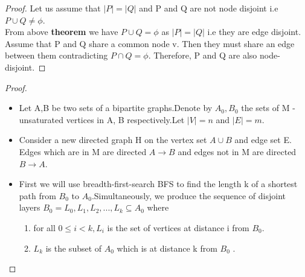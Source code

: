 \begin{proof}
Let us assume that  $|P| = |Q|$ and P and Q are not node disjoint i.e $P\cup Q \neq \phi$.\\
From above \textbf{theorem} we have $P\cup Q = \phi$ as $|P| = |Q|$ i.e they are edge disjoint. Assume that P and Q share a common node v. Then they must share an edge between them contradicting $P \cap Q = \phi.$ Therefore, P and Q are also node-disjoint.
\end{proof} 

\begin{proof}
\begin{itemize}

\item Let A,B be two sets of a bipartite graphs.Denote by $A_0 , B_0$ the sets of M -unsaturated vertices in A, B respectively.Let $|V|=n$ and $|E|=m$.
\item Consider a new directed graph H on the vertex set $A \cup B$ and edge set E.
Edges which are in M are directed $A \rightarrow B$ and edges not in M are directed $B \rightarrow A$.
\item First we will use breadth-first-search BFS to find the length k of a shortest path from $B_0$ to $A_0$.Simultaneously, we produce the sequence of disjoint layers $B_0 = L_0 , L_1 , L_2 , ..., L_k \subseteq A_0$ where
\begin{enumerate}
\item for all $0 \leq i < k, L_i$ is the set of vertices at distance i from $B_0$.
\item $L_k$ is the subset of $A_0$ which is at distance k from $B_0$ .
\end{enumerate}
\end{itemize}
\end{proof}

